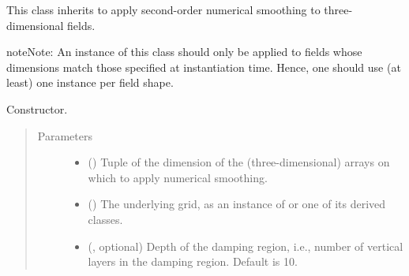 \documentclass[letterpaper,10pt,english]{sphinxmanual}
\begin{document}
\begin{fulllineitems}
\label{\detokenize{api:tasmania.dycore.horizontal_smoothing.HorizontalSmoothingSecondOrderXYZ}}
This class inherits {\hyperref[\detokenize{api:tasmania.dycore.horizontal_smoothing.HorizontalSmoothing}]{}} to apply second-order
numerical smoothing to three-dimensional fields.

\begin{sphinxadmonition}{note}{Note:}
An instance of this class should only be applied to fields whose dimensions match those specified at instantiation time.
Hence, one should use (at least) one instance per field shape.
\end{sphinxadmonition}

\begin{fulllineitems}
\label{\detokenize{api:tasmania.dycore.horizontal_smoothing.HorizontalSmoothingSecondOrderXYZ.__init__}}
Constructor.
\begin{quote}\begin{description}
\item[{Parameters}] \leavevmode\begin{itemize}
\item {} 
 () \textendash{} Tuple of the dimension of the (three-dimensional) arrays on which to apply numerical smoothing.

\item {} 
 () \textendash{} The underlying grid, as an instance of {\hyperref[\detokenize{api:tasmania.grids.grid_xyz.GridXYZ}]{}} or one of its derived classes.

\item {} 
 (, optional) \textendash{} Depth of the damping region, i.e., number of vertical layers in the damping region. Default is 10.


\end{itemize}
\end{description}
\end{quote}
\end{fulllineitems}
\end{fulllineitems}
\end{document}
